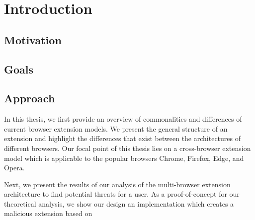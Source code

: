 \chapter{Introduction}

\section{Motivation}
\section{Goals}


\section{Approach}
	
	In this thesis, we first provide an overview of commonalities and differences of current browser extension models. We present the general structure of an extension and highlight the differences that exist between the architectures of different browsers. Our focal point of this thesis lies on a cross-browser extension model which is applicable to the popular browsers Chrome, Firefox, Edge, and Opera. 
	
	Next, we present the results of our analysis of the multi-browser extension architecture to find potential threats for a user. As a proof-of-concept for our theoretical analysis, we show our design an implementation which creates a malicious extension based on 